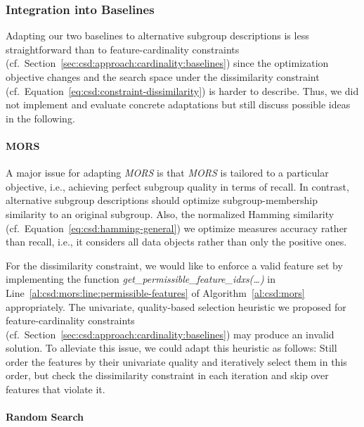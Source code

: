 \documentclass{article}
\theoremstyle{definition}
\begin{document}
\subsubsection{Integration into Baselines}
\label{sec:csd:approach:alternatives:baselines}

Adapting our two baselines to alternative subgroup descriptions is less straightforward than to feature-cardinality constraints (cf.~Section~\ref{sec:csd:approach:cardinality:baselines}) since the optimization objective changes and the search space under the dissimilarity constraint (cf.~Equation~\ref{eq:csd:constraint-dissimilarity}) is harder to describe.
Thus, we did not implement and evaluate concrete adaptations but still discuss possible ideas in the following.

\paragraph{MORS}

A major issue for adapting \emph{MORS} is that \emph{MORS} is tailored to a particular objective, i.e., achieving perfect subgroup quality in terms of recall.
In contrast, alternative subgroup descriptions should optimize subgroup-membership similarity to an original subgroup.
Also, the normalized Hamming similarity (cf.~Equation~\ref{eq:csd:hamming-general}) we optimize measures accuracy rather than recall, i.e., it considers all data objects rather than only the positive ones.

For the dissimilarity constraint, we would like to enforce a valid feature set by implementing the function \emph{get\_permissible\_feature\_idxs(\dots)} in Line~\ref{al:csd:mors:line:permissible-features} of Algorithm~\ref{al:csd:mors} appropriately.
The univariate, quality-based selection heuristic we proposed for feature-cardinality constraints (cf.~Section~\ref{sec:csd:approach:cardinality:baselines}) may produce an invalid solution.
To alleviate this issue, we could adapt this heuristic as follows:
Still order the features by their univariate quality and iteratively select them in this order, but check the dissimilarity constraint in each iteration and skip over features that violate it.

\paragraph{Random Search}
\end{document}
